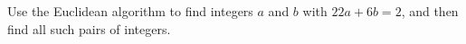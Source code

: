 Use the Euclidean algorithm to find integers $a$ and $b$ with $22a+6b=2$, and then find all such pairs of integers.
